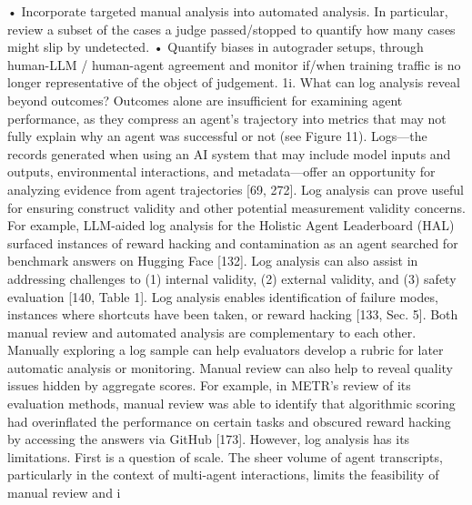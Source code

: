 • Incorporate targeted manual analysis into automated analysis. In particular, review a subset of the cases a
judge passed/stopped to quantify how many cases might slip by undetected.
• Quantify biases in autograder setups, through human-LLM / human-agent agreement and monitor if/when
training traffic is no longer representative of the object of judgement.
1i. What can log analysis reveal beyond outcomes?
Outcomes alone are insufficient for examining agent performance, as they compress an agent’s trajectory
into metrics that may not fully explain why an agent was successful or not (see Figure 11). Logs—the
records generated when using an AI system that may include model inputs and outputs, environmental
interactions, and metadata—offer an opportunity for analyzing evidence from agent trajectories [69, 272].
Log analysis can prove useful for ensuring construct validity and other potential measurement validity
concerns. For example, LLM-aided log analysis for the Holistic Agent Leaderboard (HAL) surfaced instances
of reward hacking and contamination as an agent searched for benchmark answers on Hugging Face [132].
Log analysis can also assist in addressing challenges to (1) internal validity, (2) external validity, and (3)
safety evaluation [140, Table 1]. Log analysis enables identification of failure modes, instances where
shortcuts have been taken, or reward hacking [133, Sec. 5].
Both manual review and automated analysis are complementary to each other. Manually exploring a log
sample can help evaluators develop a rubric for later automatic analysis or monitoring. Manual review
can also help to reveal quality issues hidden by aggregate scores. For example, in METR’s review of its
evaluation methods, manual review was able to identify that algorithmic scoring had overinflated the
performance on certain tasks and obscured reward hacking by accessing the answers via GitHub [173].
However, log analysis has its limitations. First is a question of scale. The sheer volume of agent transcripts,
particularly in the context of multi-agent interactions, limits the feasibility of manual review and i

